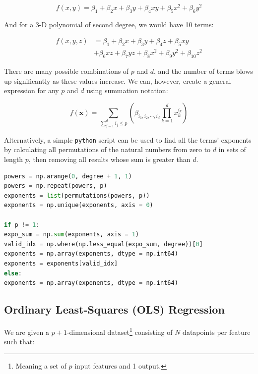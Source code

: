 \documentclass[a4paper,10pt,english]{article}
\begin{document}
\begin{multicols*}{2}
\begin{equation*}
f(x,y) = \beta_1 + \beta_2 x + \beta_3 y + \beta_4 xy + \beta_5 x^2 + \beta_6 y^2
\end{equation*}

And for a 3-D polynomial of second degree, we would have 10 terms:

\begin{align*}
f(x,y,z) &= \beta_1 + \beta_2 x + \beta_3 y + \beta_4 z + \beta_5 xy \\ &+ \beta_6 xz + \beta_7 yz + \beta_8 x^2 + \beta_9 y^2 + \beta_{10} z^2
\end{align*}

There are many possible combinations of $p$ and $d$, and the number of terms blows up significantly as these values increase.  We can, however, create a general expression \cite{2482654} for any $p$ and $d$ using summation notation:

\begin{equation}
\label{eq_method_0}
f(\mathbf{x}) = \sum_{\sum_{j = 1}^d i_j \leq p} \left( \beta_{i_1, i_2, \cdots, i_d} \prod_{k = 1}^d x_k^{i_k} \right)
\end{equation}

Alternatively, a simple \texttt{python} script can be used to find all the terms' exponents by calculating all permutations of the natural numbers from zero to $d$ in sets of length $p$, then removing all results whose sum is greater than $d$.

\begin{lstlisting}[showstringspaces=false,language=Python,firstnumber = 1]
powers = np.arange(0, degree + 1, 1)
powers = np.repeat(powers, p)
exponents = list(permutations(powers, p))
exponents = np.unique(exponents, axis = 0)

if p != 1:
expo_sum = np.sum(exponents, axis = 1)
valid_idx = np.where(np.less_equal(expo_sum, degree))[0]
exponents = np.array(exponents, dtype = np.int64)
exponents = exponents[valid_idx]
else:
exponents = np.array(exponents, dtype = np.int64)
\end{lstlisting}


\subsection*{Ordinary Least-Squares (OLS) Regression}

We are given a $p+1$-dimensional dataset\footnote{Meaning a set of $p$ input features and 1 output.} consisting of $N$ datapoints per feature such that:


\end{multicols*}
\end{document}
